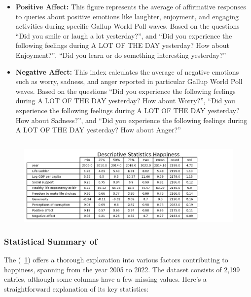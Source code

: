 \begin{itemize}
                        \item \textbf{Positive Affect:} This figure represents the average of affirmative responses to queries about positive emotions like laughter, enjoyment, and engaging activities during specific Gallup World Poll waves. Based on the questions ``Did you smile or laugh a lot yesterday?'', and ``Did you experience the following feelings during A LOT OF THE DAY yesterday? How about Enjoyment?'', ``Did you learn or do something interesting yesterday?''

                        \item \textbf{Negative Affect:} This index calculates the average of negative emotions such as worry, sadness, and anger reported in particular Gallup World Poll waves. Based on the questions ``Did you experience the following feelings during A LOT OF THE DAY yesterday? How about Worry?'', ``Did you experience the following feelings during A LOT OF THE DAY yesterday? How about Sadness?'', and ``Did you experience the following feelings during A LOT OF THE DAY yesterday? How about Anger?''

                \end{itemize}

        \subsection{\duExploreTheData}
            \begin{figure}[H]
                \centering
                \includegraphics[scale=1]{images/du_happiness_summary}
                \caption{}
                \label{fig:du-happiness-summary}
            \end{figure}

            \subsubsection{Statistical Summary of \dsHappiness}

                The \textit{\dsHappiness}(\figurename~\ref{fig:du-happiness-summary}) offers a thorough exploration into various factors contributing to happiness, spanning from the year 2005 to 2022. The dataset consists of 2,199 entries, although some columns have a few missing values. Here's a straightforward explanation of its key statistics:


